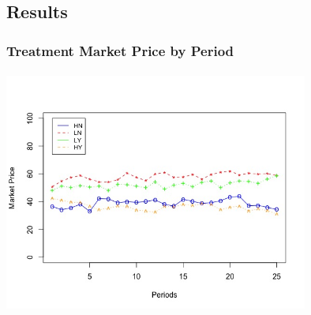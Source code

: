 \documentclass[red]{beamer}
\begin{document}
\begin{frame}
\section{Results}
\frametitle{Treatment Market Price by Period}
\begin{center}
    \includegraphics[width=10cm,height=8cm]{Mktprice by TREATMENT (1).jpeg}
\end{center}
\end{frame}
\end{document}
